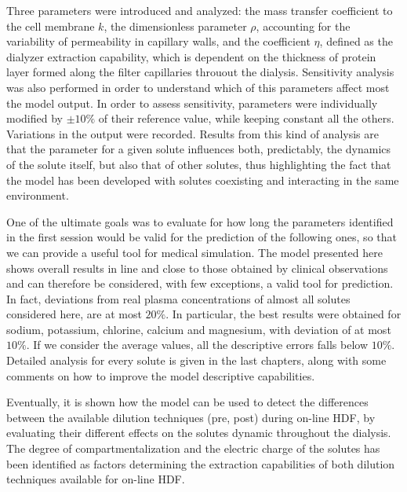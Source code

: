 Three parameters were introduced and analyzed: the mass transfer coefficient to the cell membrane $k$, the dimensionless parameter $\rho$, accounting for the variability  of permeability in capillary walls, and the coefficient $\eta$, defined as the dialyzer extraction capability, which is dependent on the thickness of protein layer formed along the filter capillaries throuout the dialysis. Sensitivity analysis was also performed in order to understand which of this parameters affect most the model output. In order to assess sensitivity, parameters were individually modified by $\pm 10\%$ of their reference value, while keeping constant all the others. Variations in the output were recorded. Results from this kind of analysis are that the parameter for a given solute influences both, predictably, the dynamics of the solute itself, but also that of other solutes, thus highlighting the fact that the model has been developed with solutes coexisting and interacting in the same environment.

One of the ultimate goals was to evaluate  for how long the parameters identified in the first session would be valid for the prediction of the following ones, so that we can provide a useful tool for medical simulation. The model presented here shows overall results in line and close to those obtained by clinical observations and can therefore be considered, with few exceptions, a valid tool for prediction. In fact, deviations from real plasma concentrations of almost all solutes considered here, are at most $20\%$. In particular, the best results were obtained for sodium, potassium, chlorine, calcium and magnesium, with deviation of at most $10\%$. If we consider the average values, all the descriptive errors falls below $10\%$. Detailed analysis for every solute is given in the last chapters, along with some comments on how to improve the model descriptive capabilities.

Eventually, it is shown how the model can be used to detect the differences between the available dilution techniques (pre, post) during on-line HDF, by evaluating their different effects on the solutes dynamic throughout the dialysis. The degree of compartmentalization and the electric charge of the solutes has been identified as factors determining the extraction capabilities of both dilution techniques available for on-line HDF.